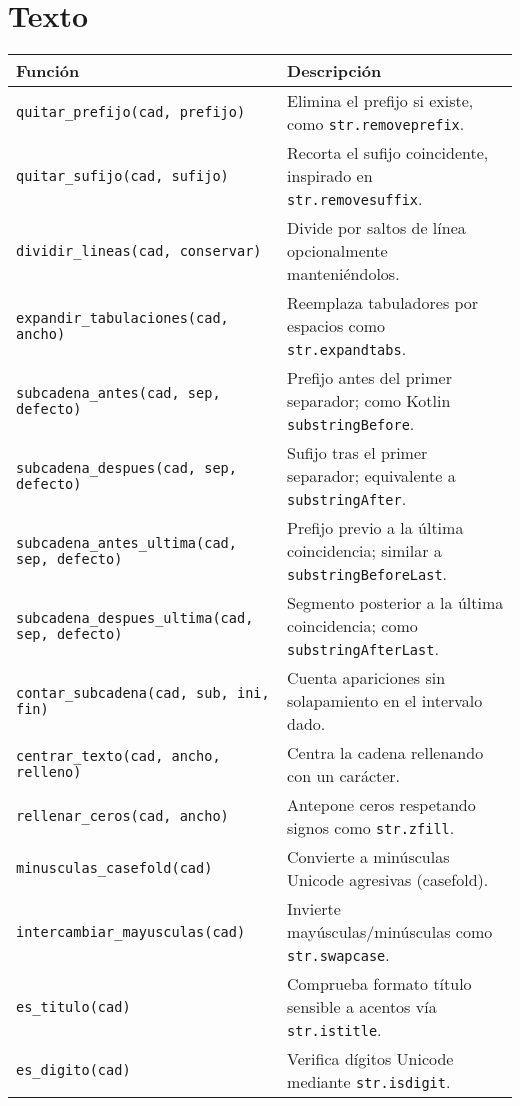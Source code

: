 \documentclass{article}
\begin{document}
\section*{Texto}
\begin{tabular}{ll}
\textbf{Función} & \textbf{Descripción}\\\hline
\texttt{quitar\_prefijo(cad, prefijo)} & Elimina el prefijo si existe, como \texttt{str.removeprefix}.\\
\texttt{quitar\_sufijo(cad, sufijo)} & Recorta el sufijo coincidente, inspirado en \texttt{str.removesuffix}.\\
\texttt{dividir\_lineas(cad, conservar)} & Divide por saltos de línea opcionalmente manteniéndolos.\\
\texttt{expandir\_tabulaciones(cad, ancho)} & Reemplaza tabuladores por espacios como \texttt{str.expandtabs}.\\
\texttt{subcadena\_antes(cad, sep, defecto)} & Prefijo antes del primer separador; como Kotlin \texttt{substringBefore}.\\
\texttt{subcadena\_despues(cad, sep, defecto)} & Sufijo tras el primer separador; equivalente a \texttt{substringAfter}.\\
\texttt{subcadena\_antes\_ultima(cad, sep, defecto)} & Prefijo previo a la última coincidencia; similar a \texttt{substringBeforeLast}.\\
\texttt{subcadena\_despues\_ultima(cad, sep, defecto)} & Segmento posterior a la última coincidencia; como \texttt{substringAfterLast}.\\
\texttt{contar\_subcadena(cad, sub, ini, fin)} & Cuenta apariciones sin solapamiento en el intervalo dado.\\
\texttt{centrar\_texto(cad, ancho, relleno)} & Centra la cadena rellenando con un carácter.\\
\texttt{rellenar\_ceros(cad, ancho)} & Antepone ceros respetando signos como \texttt{str.zfill}.\\
\texttt{minusculas\_casefold(cad)} & Convierte a minúsculas Unicode agresivas (casefold).\\
\texttt{intercambiar\_mayusculas(cad)} & Invierte mayúsculas/minúsculas como \texttt{str.swapcase}.\\
\texttt{es\_titulo(cad)} & Comprueba formato título sensible a acentos vía \texttt{str.istitle}.\\
\texttt{es\_digito(cad)} & Verifica dígitos Unicode mediante \texttt{str.isdigit}.\\
\end{tabular}
\end{document}
